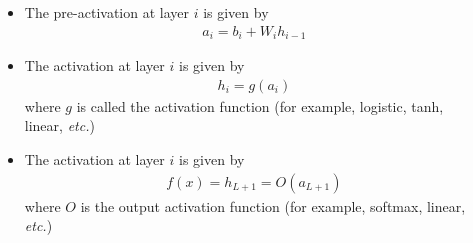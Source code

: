 \begin{frame}
  \begin{columns}
    \begin{overlayarea}{\textwidth}{\textheight}
      \makebox[\textwidth][c]{\usebox{\nncontent}}
    \end{overlayarea}

    \begin{overlayarea}{\textwidth}{\textheight}
      \begin{itemize}
        \item The pre-activation at layer $i$ is given by
            \begin{align*}
              a_i = b_i + W_i h_{i-1}
            \end{align*}
        \item The activation at layer $i$ is given by
            \begin{align*}
              h_i = g(a_i)
            \end{align*}
            where $g$ is called the activation function (for example, logistic, tanh, linear, \textit{etc.})
        \item The activation at layer $i$ is given by
            \begin{align*}
              f(x) = h_{L+1} = O(a_{L+1})
            \end{align*}
            where $O$ is the output activation function (for example, softmax, linear, \textit{etc.})
      \end{itemize}
    \end{overlayarea}

  \end{columns}
\end{frame}


